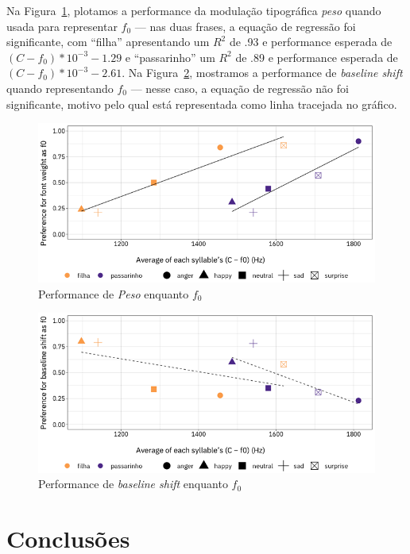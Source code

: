 \documentclass[11pt]{article}
\begin{document}
  Na Figura~\ref{fig:font_weight_as_f0}, plotamos a performance da modulação tipográfica {\itshape peso} quando usada para representar $f_0$ --- nas duas frases, a equação de regressão foi significante, com ``filha'' apresentando um $R^2$ de .93 e performance esperada de $(C-f_0) * 10^{-3} - 1.29$ e ``passarinho'' um $R^2$ de .89 e performance esperada de $(C-f_0) * 10^{-3} - 2.61$. Na Figura~\ref{fig:baseline_shift_as_f0}, mostramos a performance de {\itshape baseline shift} quando representando $f_0$ --- nesse caso, a equação de regressão não foi significante, motivo pelo qual está representada como linha tracejada no gráfico.
  
\begin{figure}[H]
     {\centering
\includegraphics[width=0.9\linewidth]{fig/font_weight_as_pitch.png}
     \caption{Performance de {\itshape Peso} enquanto $f_0$}
     \label{fig:font_weight_as_f0}\par}
\end{figure}

\begin{figure}[H]
     {\centering
\includegraphics[width=0.9\linewidth]{fig/baseline_shift_as_pitch.png}
     \caption{Performance de {\itshape baseline shift} enquanto $f_0$}
     \label{fig:baseline_shift_as_f0}\par}
\end{figure}

\section{Conclus\~{o}es}
  \label{sec:conclusoes}
  
\end{document}
